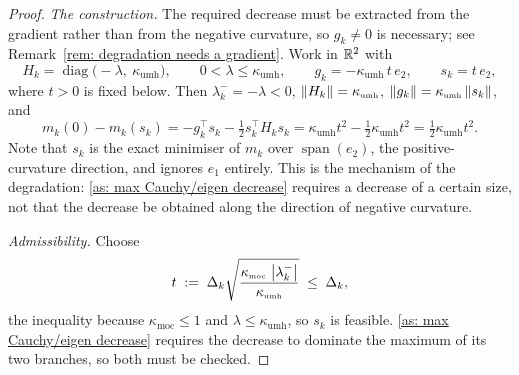 \documentclass[11pt]{article}
\theoremstyle{plain}
\theoremstyle{definition}
\theoremstyle{remark}
\numberwithin{equation}{section}
\providecommand{\defeq}{\mathrel{:=}}
\newcommand*\mykappa[1]{\kappa_{\scriptscriptstyle\text{#1}}}
\begin{document}
\begin{proof}
    \emph{The construction.} The required decrease must be extracted from the gradient rather than
    from the negative curvature, so $g_k \neq 0$ is necessary; see
    Remark~\ref{rem: degradation needs a gradient}. Work in ${\mathbb{R}}^2$ with
    \begin{equation*}
        H_k = \operatorname{diag}\bigl(-\lambda,\ \mykappa{umh}\bigr),
        \qquad 0 < \lambda \leq \mykappa{umh},
        \qquad
        g_k = -\mykappa{umh}\, t\, e_2 ,
        \qquad
        s_k = t\, e_2 ,
    \end{equation*}
    where $t > 0$ is fixed below. Then $\lambda_k^- = -\lambda < 0$,
    $\norm{H_k} = \mykappa{umh}$, $\norm{g_k} = \mykappa{umh}\norm{s_k}$, and
    \begin{equation*}
        m_k(0) - m_k(s_k)
        = -g_k^\top s_k - \tfrac12 s_k^\top H_k s_k
        = \mykappa{umh} t^2 - \tfrac12 \mykappa{umh} t^2
        = \tfrac12 \mykappa{umh} t^2 .
    \end{equation*}
    Note that $s_k$ is the exact minimiser of $m_k$ over $\operatorname{span}(e_2)$, the
    positive-curvature direction, and ignores $e_1$ entirely. This is the mechanism of the
    degradation: \ref{as: max Cauchy/eigen decrease} requires a decrease of a certain size, not
    that the decrease be obtained along the direction of negative curvature.

    \emph{Admissibility.} Choose
    \begin{equation}
        t \;\defeq\; \Delta_k \sqrt{\frac{\mykappa{moc}\,\abs{\lambda_k^-}}{\mykappa{umh}}}
        \;\leq\; \Delta_k ,
        \label{eqn: degradation step}
    \end{equation}
    the inequality because $\mykappa{moc} \leq 1$ and $\lambda \leq \mykappa{umh}$, so $s_k$ is
    feasible. \ref{as: max Cauchy/eigen decrease} requires the decrease to dominate the maximum
    of its two branches, so both must be checked.


\end{proof}
\end{document}
